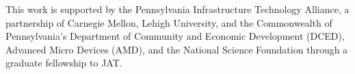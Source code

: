 \documentclass[twocolumn,10pt]{asme2e}
\begin{document}
\begin{acknowledgment}
This work is supported by the Pennsylvania Infrastructure Technology
Alliance, a partnership of Carnegie Mellon, Lehigh University, and the
Commonwealth of Pennsylvania's Department of Community and Economic
Development (DCED),  Advanced Micro Devices (AMD), and the National Science
Foundation through a graduate fellowship to JAT.
\end{acknowledgment}





\end{document}
